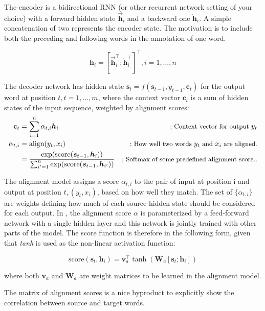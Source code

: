 The encoder is a bidirectional RNN (or other recurrent network setting of your choice) with a forward hidden state $\overrightarrow{\boldsymbol{h}}_i$ and a backward one $\overleftarrow{\boldsymbol{h}}_i$. A simple concatenation of two represents the encoder state. The motivation is to include both the preceding and following words in the annotation of one word.

$$
\boldsymbol{h}_i = [\overrightarrow{\boldsymbol{h}}_i^\top; \overleftarrow{\boldsymbol{h}}_i^\top]^\top, i=1,\dots,n
$$

The decoder network has hidden state $\boldsymbol{s}_t=f(\boldsymbol{s}_{t-1}, y_{t-1}, \mathbf{c}_t)$ for the output word at position $t, t=1,\dots,m$, where the context vector $\mathbf{c}_t$ is a sum of hidden states of the input sequence, weighted by alignment scores:
$$
\begin{aligned}
\mathbf{c}_t &= \sum_{i=1}^n \alpha_{t,i} \boldsymbol{h}_i & \small{\text{; Context vector for output }y_t}\\
\alpha_{t,i} &= \text{align}(y_t, x_i) & \small{\text{; How well two words }y_t\text{ and }x_i\text{ are aligned.}}\\
&= \frac{\exp(\text{score}(\boldsymbol{s}_{t-1}, \boldsymbol{h}_i))}{\sum_{i'=1}^n \exp(\text{score}(\boldsymbol{s}_{t-1}, \boldsymbol{h}_{i'}))} & \small{\text{; Softmax of some predefined alignment score.}}.
\end{aligned}
$$

The alignment model assigns a score $\alpha_{t,i}$ to the pair of input at position i and output at position $t, (y_t, x_i)$, based on how well they match. The set of $\{\alpha_{t, i}\}$ are weights defining how much of each source hidden state should be considered for each output. In \citep{Bahdanau2015}, the alignment score $\alpha$ is parameterized by a feed-forward network with a single hidden layer and this network is jointly trained with other parts of the model. The score function is therefore in the following form, given that \textit{tanh} is used as the non-linear activation function:

$$\text{score}(\boldsymbol{s}_t, \boldsymbol{h}_i) = \mathbf{v}_a^\top \tanh(\mathbf{W}_a[\boldsymbol{s}_t; \boldsymbol{h}_i])$$

where both $\mathbf{v}_a$ and $\mathbf{W}_a$ are weight matrices to be learned in the alignment model.

The matrix of alignment scores is a nice byproduct to explicitly show the correlation between source and target words.

